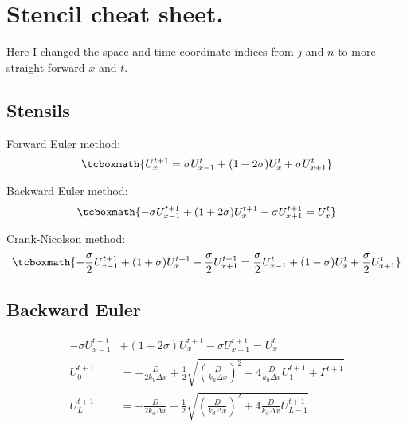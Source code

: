 \documentclass[12pt]{article}
\begin{document}
\section{Stencil cheat sheet.}
Here I changed the space and time coordinate indices from $j$ and $n$ to more straight forward $x$ and $t$.
\subsection{Stensils}

Forward Euler method:
\begin{equation}
    \tcboxmath{
    U_{x}^{t+1} = \sigma U_{x-1}^{t} + (1-2\sigma)U_{x}^{t} + \sigma U_{x+1}^{t}
    }
\end{equation}

Backward Euler method:
\begin{equation}
    \tcboxmath{
    -\sigma U_{x-1}^{t+1} + (1+2\sigma)U_{x}^{t+1} - \sigma U_{x+1}^{t+1} = U_{x}^{t}
    }
\end{equation}

Crank-Nicolson method:
\begin{equation}
    \tcboxmath{
    -\frac{\sigma}{2} U_{x-1}^{t+1} + (1+\sigma)U_{x}^{t+1} - \frac{\sigma}{2} U_{x+1}^{t+1} = \frac{\sigma}{2} U_{x-1}^{t} + (1-\sigma)U_{x}^{t} + \frac{\sigma}{2} U_{x+1}^{t}
    }
\end{equation}

\subsection{Backward Euler}

\begin{align}
    -\sigma U_{x-1}^{t+1} &+ (1+2\sigma)U_{x}^{t+1} - \sigma U_{x+1}^{t+1} = U_{x}^{t}\\
    U_{0}^{t+1} &= -\frac{D}{2k_u\Delta x} + \frac{1}{2}\sqrt{\left(\frac{D}{k_u\Delta x}\right)^2 + 4\frac{D}{k_u\Delta x}U_{1}^{t+1} + \Gamma^{t+1}}\\
    U_{L}^{t+1} &= -\frac{D}{2k_d\Delta x} + \frac{1}{2}\sqrt{\left(\frac{D}{k_d\Delta x}\right)^2 + 4\frac{D}{k_d\Delta x}U_{L-1}^{t+1}}
\end{align}
\end{document}
